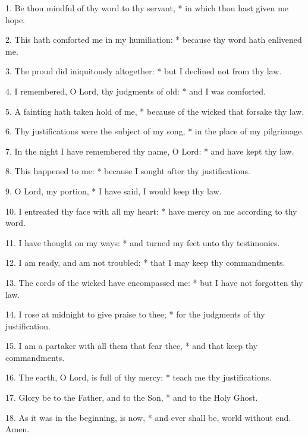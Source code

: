 1. Be thou mindful of thy word to thy servant, * in which thou hast given me hope.

2. This hath comforted me in my humiliation: * because thy word hath enlivened me.

3. The proud did iniquitously altogether: * but I declined not from thy law.

4. I remembered, O Lord, thy judgments of old: * and I was comforted.

5. A fainting hath taken hold of me, * because of the wicked that forsake thy law.

6. Thy justifications were the subject of my song, * in the place of my pilgrimage.

7. In the night I have remembered thy name, O Lord: * and have kept thy law.

8. This happened to me: * because I sought after thy justifications.

9. O Lord, my portion, * I have said, I would keep thy law.

10. I entreated thy face with all my heart: * have mercy on me according to thy word.

11. I have thought on my ways: * and turned my feet unto thy testimonies.

12. I am ready, and am not troubled: * that I may keep thy commandments.

13. The cords of the wicked have encompassed me: * but I have not forgotten thy law.

14. I rose at midnight to give praise to thee; * for the judgments of thy justification.

15. I am a partaker with all them that fear thee, * and that keep thy commandments.

16.  The earth, O Lord, is full of thy mercy: * teach me thy justifications.

17. Glory be to the Father, and to the Son, * and to the Holy Ghost.

18. As it was in the beginning, is now, * and ever shall be, world without end. Amen.